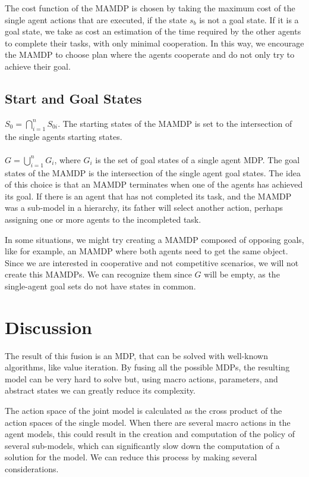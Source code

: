 The cost function of the MAMDP is chosen by taking the maximum cost of the single agent actions that are executed, if the state $s_b$ is not a goal state. If it is a goal state, we take as cost an estimation of the time required by the other agents to complete their tasks, with only minimal cooperation. In this way, we encourage the MAMDP to choose plan where the agents cooperate and do not only try to achieve their goal.

\subsection{Start and Goal States}
$S_0=\bigcap_{i=1}^n S_{0i}$. The starting states of the MAMDP is set to the intersection of the single agents starting states.\\\\$G=\bigcup_{i=1}^n G_i $, where $G_i$ is the set of goal states of a single agent MDP. The goal states of the MAMDP is the intersection of the single agent goal states. The idea of this choice is that an MAMDP terminates when one of the agents has achieved its goal. If there is an agent that has not completed its task, and the MAMDP was a sub-model in a hierarchy, its father will select another action, perhaps assigning one or more agents to the incompleted task. 

In some situations, we might try creating a MAMDP composed of opposing goals, like for example, an MAMDP where both agents need to get the same object. Since we are interested in cooperative and not competitive scenarios, we will not create this MAMDPs. We can recognize them since $G$ will be empty, as the single-agent goal sets do not have states in common.

\section{Discussion}
\label{sec:mamdp-discussion}

The result of this fusion is an MDP, that can be solved with well-known algorithms, like value iteration. By fusing all the possible MDPs, the resulting model can be  very hard to solve but, using macro actions, parameters, and abstract states we can greatly reduce its complexity. 

The action space of the joint model is calculated as the cross product of the action spaces of the single model. When there are several macro actions in the agent models, this could result in the creation and computation of the policy of several sub-models, which can significantly slow down the computation of a solution for the model. We can reduce this process by making several considerations.

